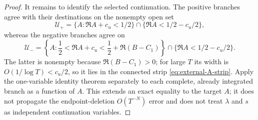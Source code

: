 \begin{proof}
It remains to identify the selected continuation.  The positive branches
agree with their destinations on the nonempty open set
\[
 \mathscr U_+=\{A:\Re A+c_u<1/2\}
                \cap\{\Re A<1/2-c_u/2\},
\]
whereas the negative branches agree on
\[
 \mathscr U_-=\left\{A:\frac12<\Re A+c_u
       <\frac12+\Re(B-C_1)\right\}
                \cap\{\Re A<1/2-c_u/2\}.
\]
The latter is nonempty because $\Re(B-C_1)>0$; for large $T$ its width is
$O(1/\log T)<c_u/2$, so it lies in the connected strip
\eqref{eq:external-A-strip}.  Apply the one-variable identity theorem
separately to each complete, already integrated branch as a function of
$A$.  This extends an exact equality to the target $A$; it does not
propagate the endpoint-deletion $O(T^{-N})$ error and does not treat
$\lambda$ and $s$ as independent continuation variables.
\end{proof}
